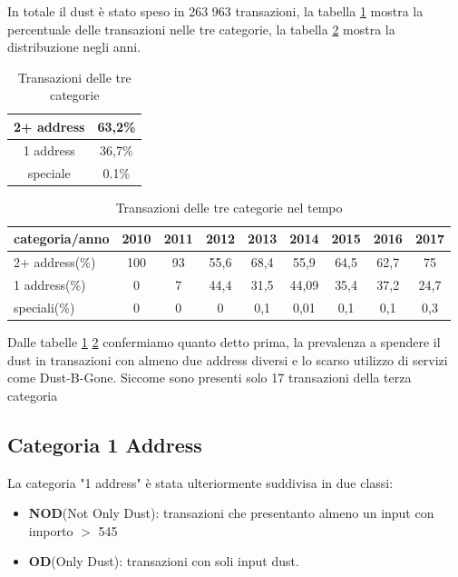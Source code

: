 In totale il dust è stato speso in 263 963 transazioni, la tabella \ref{tab:tx_categories} mostra la percentuale delle transazioni nelle tre categorie, la tabella \ref{tab:tx_categories_year} mostra la distribuzione negli anni.
\begin{table}[H]
    \centering
    \begin{tabular}{|c|c|}
        \hline
        2+ address & 63,2\%\\
        \hline
        1 address & 36,7\%\\
        \hline
        speciale & 0.1\%\\
        \hline
    \end{tabular}
    \caption{Transazioni delle tre categorie}
    \label{tab:tx_categories}
\end{table}
\begin{table}[H]
    \centering
    \begin{tabular}{|l|c|c|c|c|c|c|c|c|}
        \hline
            categoria/anno  & 2010 & 2011 & 2012 & 2013 & 2014 & 2015 & 2016 & 2017\\
        \hline 
         2+ address(\%) & 100 & 93 & 55,6 & 68,4 & 55,9 & 64,5 & 62,7 & 75 \\
         \hline
         1 address(\%) & 0 & 7 & 44,4 & 31,5 & 44,09 & 35,4 & 37,2 & 24,7  \\
         \hline
         speciali(\%) & 0 & 0 & 0 & 0,1 & 0,01 & 0,1 & 0,1 & 0,3 \\
         \hline
    \end{tabular}
    \caption{Transazioni delle tre categorie nel tempo}
    \label{tab:tx_categories_year}
\end{table}
Dalle tabelle \ref{tab:tx_categories} \ref{tab:tx_categories_year} confermiamo quanto detto prima, la prevalenza a spendere il dust in transazioni con almeno due address diversi e lo scarso utilizzo di servizi come Dust-B-Gone. Siccome sono presenti solo 17 transazioni della terza categoria 
\subsection{Categoria 1 Address}
La categoria "1 address" è stata ulteriormente suddivisa in due classi:
\begin{itemize}
    \item \textbf{NOD}(Not Only Dust): transazioni che presentanto almeno un input con importo $>$ 545  
    \item \textbf{OD}(Only Dust): transazioni con soli input dust.
\end{itemize}


